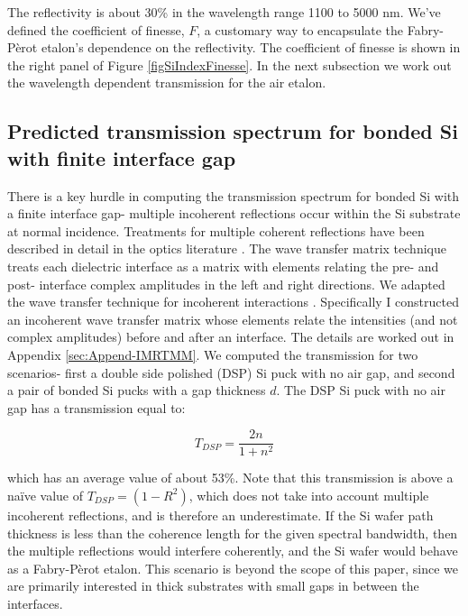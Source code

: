 \documentclass[osajnl,preprint,showpacs,superscriptaddress,12pt]{revtex4-1} %
\begin{document}
The reflectivity is about 30\% in the wavelength range 1100 to 5000 nm.  We've defined the coefficient of finesse\cite{2007fuph.book.....S}, $F$, a customary way to encapsulate the Fabry-P\`{e}rot etalon's dependence on the reflectivity.  The coefficient of finesse is shown in the right panel of Figure \ref{figSiIndexFinesse}.  In the next subsection we work out the wavelength dependent transmission for the air etalon.


\subsection{Predicted transmission spectrum for bonded Si with finite interface gap}
\label{secTheory}
There is a key hurdle in computing the transmission spectrum for bonded Si with a finite interface gap- multiple incoherent reflections occur within the Si substrate at normal incidence.  Treatments for multiple coherent reflections have been described in detail in the optics literature \cite{2007fuph.book.....S}.  The wave transfer matrix technique treats each dielectric interface as a matrix with elements relating the pre- and post- interface complex amplitudes in the left and right directions.  We adapted the wave transfer technique for incoherent interactions \cite{2002ApOpt..41.3978K}.  Specifically I constructed an incoherent wave transfer matrix whose elements relate the intensities (and not complex amplitudes) before and after an interface.  The details are worked out in Appendix \ref{sec:Append-IMRTMM}.  We computed the transmission for two scenarios- first a double side polished (DSP) Si puck with no air gap, and second a pair of bonded Si pucks with a gap thickness $d$.  The DSP Si puck with no air gap has a transmission equal to:

$$
T_{DSP} = \frac{2n}{1+n^2}
$$

which has an average value of about 53\%.  Note that this transmission is above a na\"ive value of $T_{DSP}=(1-R^2)$, which does not take into account multiple incoherent reflections, and is therefore an underestimate.  If the Si wafer path thickness is less than the coherence length for the given spectral bandwidth, then the multiple reflections would interfere coherently, and the Si wafer would behave as a Fabry-P\`erot etalon.  This scenario is beyond the scope of this paper, since we are primarily interested in thick substrates with small gaps in between the interfaces.
\end{document}
